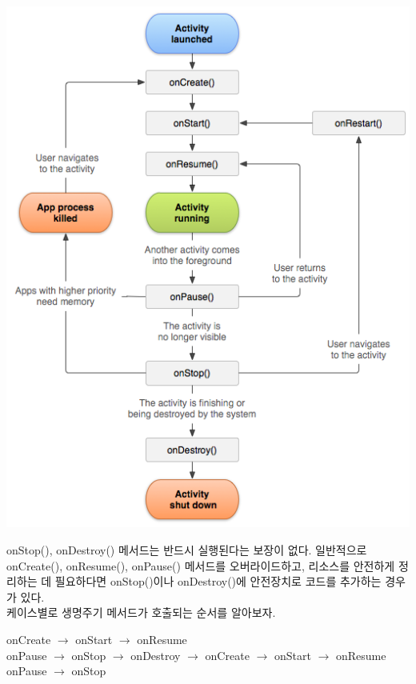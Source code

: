\includegraphics[scale=0.5]{activity-lifecycle}

onStop(), onDestroy() 메서드는 반드시 실행된다는 보장이 없다. 
일반적으로 onCreate(), onResume(), onPause() 메서드를 오버라이드하고, 리소스를 안전하게 정리하는 데 필요하다면 onStop()이나 onDestroy()에 안전장치로 코드를 추가하는 경우가 있다.\\

케이스별로 생명주기 메서드가 호출되는 순서를 알아보자.\label{flow}

onCreate $\rightarrow$ onStart $\rightarrow$ onResume\\

onPause $\rightarrow$ onStop $\rightarrow$ onDestroy $\rightarrow$ onCreate $\rightarrow$ onStart $\rightarrow$ onResume\\

onPause $\rightarrow$ onStop\\

